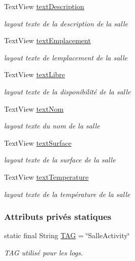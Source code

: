 \begin{DoxyCompactItemize}
Text\+View \hyperlink{classcom_1_1lasalle_1_1meeting_1_1_salle_activity_acc3b8d915861076b132cdc33f4d9f298}{text\+Description}
\begin{DoxyCompactList}\small\item\em layout texte de la description de la salle \end{DoxyCompactList}\item 
Text\+View \hyperlink{classcom_1_1lasalle_1_1meeting_1_1_salle_activity_a3e7b6e7c522546e84409d3b658985ca8}{text\+Emplacement}
\begin{DoxyCompactList}\small\item\em layout texte de l\textquotesingle{}emplacement de la salle \end{DoxyCompactList}\item 
Text\+View \hyperlink{classcom_1_1lasalle_1_1meeting_1_1_salle_activity_a3d80063be535c4f343498d1d0616092d}{text\+Libre}
\begin{DoxyCompactList}\small\item\em layout texte de la disponibilité de la salle \end{DoxyCompactList}\item 
Text\+View \hyperlink{classcom_1_1lasalle_1_1meeting_1_1_salle_activity_acb7acab3be7f76509ac3de29e715e008}{text\+Nom}
\begin{DoxyCompactList}\small\item\em layout texte du nom de la salle \end{DoxyCompactList}\item 
Text\+View \hyperlink{classcom_1_1lasalle_1_1meeting_1_1_salle_activity_a0fb3dcfded70ba78d8ce46a507ff7ef2}{text\+Surface}
\begin{DoxyCompactList}\small\item\em layout texte de la surface de la salle \end{DoxyCompactList}\item 
Text\+View \hyperlink{classcom_1_1lasalle_1_1meeting_1_1_salle_activity_a234ef25278aeb3164d379158fc294283}{text\+Temperature}
\begin{DoxyCompactList}\small\item\em layout texte de la température de la salle \end{DoxyCompactList}\end{DoxyCompactItemize}
\subsubsection*{Attributs privés statiques}
\begin{DoxyCompactItemize}
\item 
static final String \hyperlink{classcom_1_1lasalle_1_1meeting_1_1_salle_activity_a70adba176c2984edf5ae1b188017ac25}{T\+AG} = \char`\"{}Salle\+Activity\char`\"{}
\begin{DoxyCompactList}\small\item\em T\+AG utilisé pour les logs. \end{DoxyCompactList}\end{DoxyCompactItemize}


